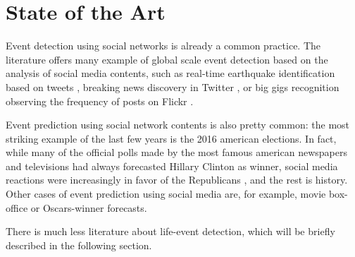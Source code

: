\chapter{State of the Art}
\label{cha:intro}

Event detection using social networks is already a common practice. The literature offers many example of global scale event detection based on the analysis of social media contents, such as real-time earthquake identification based on tweets \cite{sakaki2010earthquake}, breaking news discovery in Twitter \cite{jackoway2011identification, phuvipadawat2010breaking}, or big gigs recognition observing the frequency of posts on Flickr \cite{liu2011using}.

Event prediction using social network contents is also pretty common: the most striking example of the last few years is the 2016 american elections. In fact, while many of the official polls made by the most famous american newspapers and televisions had always forecasted Hillary Clinton as winner, social media reactions were increasingly in favor of the Republicans \cite{elections}, and the rest is history. Other cases of event prediction using social media are, for example, movie box-office \cite{asur2010predicting} or Oscars-winner forecasts.

There is much less literature about life-event detection, which will be briefly described in the following section.

